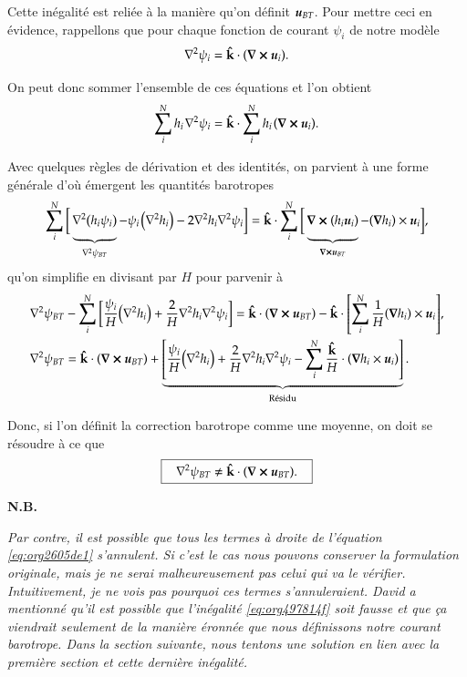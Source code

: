 \documentclass[10pt]{article}
\numberwithin{equation}{section}
\newcommand{\kvf}{\vb{\hat{k}}}
\newcommand{\uu}{\vb*{u}}
\newcommand{\pt}{\hspace{1pt}}
\newcommand{\grande}{\vphantom{\frac{1}{xx}}}
\newcommand{\nb}{\textbf{N.B.}\hspace{4pt}}
\begin{document}
Cette inégalité est reliée à la manière qu'on définit \(\uu_{BT}\).
Pour mettre ceci en évidence, rappellons que pour chaque fonction de courant \(\psi_i\) de notre modèle
\begin{equation}
   \laplacian{\psi_i} = \kvf\cdot\qty(\curl{\uu_i}).
\end{equation}

On peut donc sommer l'ensemble de ces équations et l'on obtient
\begin{equation}
   \sum_i^Nh_i\pt\laplacian{\psi_i} = \kvf\cdot \sum_i^N h_i\pt \qty(\curl{\uu_i}).
\end{equation}

Avec quelques règles de dérivation et des identités, on parvient à une forme générale d'où émergent les quantités barotropes
\begin{align}
   \sum_i^N \bigg[ \underbrace{\grande\laplacian(h_i\psi_i)}_{\laplacian{\psi_{BT}}} - \psi_i\pt\qty(\laplacian{h_i}) - 2 \laplacian{h_i}\laplacian{\psi_i}\bigg]
    = \kvf\cdot \sum_i^N \bigg[ \underbrace{\grande\curl(h_i \uu_i)}_{\curl{\uu_{BT}}}  - \qty(\gradient{h_i})\times\uu_i\bigg],
\end{align}
qu'on simplifie en divisant par \(H\) pour parvenir à
\begin{align}
\label{eq:org2605de1}
   &\laplacian{\psi_{BT}} - \sum_i^N \bigg[ \frac{\psi_i}{H} \qty(\laplacian{h_i}) + \frac{2}{H} \laplacian{h_i}\laplacian{\psi_i}\bigg]
    = \kvf\cdot  \qty(\curl{ \uu_{BT}}) - \kvf\cdot \qty[\sum_i^N \frac{1}{H} \qty(\gradient{h_i})\times\uu_i],\nonumber\\
%
   &\laplacian{\psi_{BT}}
    = \kvf\cdot  \qty(\curl{ \uu_{BT}}) + \underbrace{\qty[ \frac{\psi_i}{H} \qty(\laplacian{h_i}) + \frac{2}{H} \laplacian{h_i}\laplacian{\psi_i}  -
\sum_i^N \frac{\kvf}{H}\cdot\qty(\gradient{h_i}\times\uu_i)]}_\text{Résidu}.
\end{align}

Donc, si l'on définit la correction barotrope comme une moyenne, on doit se résoudre à ce que
\begin{equation}
\label{eq:org497814f}
   \boxed{\hspace{0.3cm}\laplacian{\psi_{BT}} \not= \kvf\cdot  \qty(\curl{ \uu_{BT}}).\hspace{0.3cm}}
\end{equation}

\nb\begin{minipage}[t]{0.9\linewidth}
\itshape Par contre, il est possible que tous les termes à droite de l'équation \ref{eq:org2605de1} s'annulent.
Si c'est le cas nous pouvons conserver la formulation originale, mais je ne serai malheureusement pas celui qui va le vérifier.
Intuitivement, je ne vois pas pourquoi ces termes s'annuleraient.
David a mentionné qu'il est possible que l'inégalité \ref{eq:org497814f} soit fausse et que ça viendrait seulement de la manière éronnée que nous définissons notre courant barotrope.
Dans la section suivante, nous tentons une solution en lien avec la première section et cette dernière inégalité.
\end{minipage}
\end{document}
